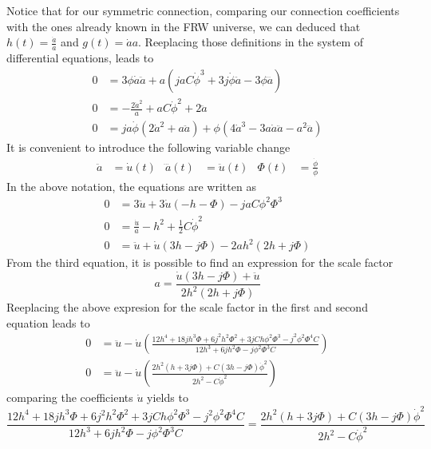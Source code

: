 \documentclass[10pt,a4paper]{article}
\begin{document}
Notice that for our symmetric connection, comparing our connection coefficients with the ones already known in the FRW universe, we can deduced that
$h(t) = \frac{\dot{a}}{a}$ and $g(t) = \dot{a}a$. Reeplacing those definitions in the system of differential equations, leads to
\begin{align}
  0 & = 3\phi \dot{a}\ddot{a} + a\left(jaC\dot{\phi}^3 + 3j \dot{\phi}\ddot{a} - 3\phi \dddot{a}\right) \\
  0 & = -\frac{2\dot{a}^2}{a} + aC\dot{\phi}^2 + 2\ddot{a}\\
  0 & = ja\dot{\phi}\left(2\dot{a}^2 + a\ddot{a}\right) + \phi\left(4\dot{a}^3 -3a\dot{a}\ddot{a} - a^2 \dddot{a}\right)
\end{align}
It is convenient to introduce the following variable change
\begin{align}
  \ddot{a} & = \dot{u}(t) & \dddot{a}(t) & = \ddot{u}(t) & \Phi(t) & = \frac{\dot{\phi}}{\phi}
\end{align}
In the above notation, the equations are written as
\begin{align}
  0 & = 3\ddot{u} + 3\dot{u}\left(-h- \Phi\right) - jaC\phi^2\Phi^3 \\
  0 & = \frac{\dot{u}}{a} - h^2 + \frac{1}{2}C\dot{\phi}^2 \\
  0 & = \ddot{u} + \dot{u}\left(3h - j\Phi\right) - 2ah^2\left(2h + j\Phi\right)
\end{align}
From the third equation, it is possible to find an expression for the scale factor
\begin{equation}
  a = \frac{\dot{u}\left(3h - j\Phi\right) + \ddot{u} }{2h^2\left(2h + j\Phi\right)}
\end{equation}
Reeplacing the above expresion for the scale factor in the first and second equation leads to
\begin{align}
  0 & = \ddot{u} - \dot{u}\left(\frac{12h^4 + 18jh^3\Phi + 6j^2h^2\Phi^2 + 3jCh\phi^2\Phi^3 - j^2\phi^2\Phi^4C}{12h^3 + 6jh^2\Phi - j\phi^2\Phi^3 C}\right) \\
  0 & = \ddot{u} - \dot{u}\left(\frac{2h^2\left(h+3j\Phi\right)+C\left(3h - j\Phi\right)\dot{\phi}^2}{2h^2 - C\dot{\phi}^2}\right)
\end{align}
comparing the coefficients $\dot{u}$ yields to
\begin{equation}
  \frac{12h^4 + 18jh^3\Phi + 6j^2h^2\Phi^2 + 3jCh\phi^2\Phi^3 - j^2\phi^2\Phi^4C}{12h^3 + 6jh^2\Phi - j\phi^2\Phi^3 C} = \frac{2h^2\left(h+3j\Phi\right)+C\left(3h - j\Phi\right)\dot{\phi}^2}{2h^2 - C\dot{\phi}^2}
\end{equation}
\end{document}
